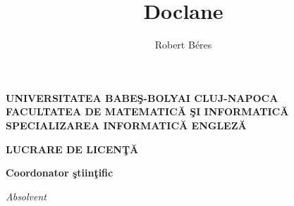 \documentclass[12pt]{report}
\begin{document}
\title{Doclane}					   
\author{Robert Béres}											
				
\maketitle

\makeatletter
\begin{titlepage}
\begin{center}
{\Large\textbf{
UNIVERSITATEA BABE\c S-BOLYAI CLUJ-NAPOCA \\
FACULTATEA DE MATEMATIC\u A \c SI INFORMATIC\u A \\
SPECIALIZAREA INFORMATIC\u A ENGLEZ\u A \\
}}
\end{center}

\vspace{10em}

\begin{center}
{\Huge\textbf{LUCRARE DE LICEN\c T\u A}}
\end{center}

\vspace{3em}

\begin{center}
{\huge\textbf{\@title}}
\end{center}

\vspace{10em}

\begin{flushleft}
{\Large\textbf{
Coordonator \c stiin\c tific \\ \@supervisor
}}
\end{flushleft}

\vspace{3em}

\begin{flushright}
{\Large\textit{
Absolvent \\ \@author
}}
\end{flushright}

\vfill

\begin{center}
{\Large{\the\year}}
\end{center}
\end{titlepage}
\makeatother


\newpage
\thispagestyle{empty}
\mbox{}
\newpage
{} 
\end{document}
